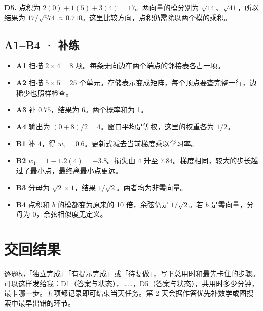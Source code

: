 \documentclass[UTF8,a4paper,11pt]{ctexart}
\begin{document}
\textbf{D5.} 点积为 $2(0)+1(5)+3(4)=17$。两向量的模分别为 $\sqrt{14}$、$\sqrt{41}$，所以结果为 $17/\sqrt{574}\approx0.710$。这里比较方向，点积仍需除以两个模的乘积。

\subsection{A1–B4 · 补练}
\begin{itemize}
\item \textbf{A1} 扫描 $2\times4=8$ 项。每条无向边在两个端点的邻接表各占一项。
\item \textbf{A2} 扫描 $5\times5=25$ 个单元。存储表示变成矩阵，每个顶点要查完整一行，边稀少也照样检查。
\item \textbf{A3} 补 $0.75$，结果为 $6$。两个概率和为 1。
\item \textbf{A4} 输出为 $(0+8)/2=4$。窗口平均是等权，这里的权重各为 $1/2$。
\item \textbf{B1} 补 $4$，得 $w_1=0.6$。更新式减去当前梯度乘以学习率。
\item \textbf{B2} $w_1=1-1.2(4)=-3.8$。损失由 $4$ 升至 $7.84$。梯度相同，较大的步长越过了最小点，最终离最小点更远。
\item \textbf{B3} 分母为 $\sqrt2\times1$，结果 $1/\sqrt2$。两者均为非零向量。
\item \textbf{B4} 点积和 $b$ 的模都变为原来的 10 倍，余弦仍是 $1/\sqrt2$。若 $b$ 是零向量，分母为 0，余弦相似度无定义。
\end{itemize}
\section{交回结果}
逐题标「独立完成」「有提示完成」或「待复做」，写下总用时和最先卡住的步骤。可以这样发给我：D1（答案与状态），……，D5（答案与状态），共用时多少分钟，最卡哪一步。五项都记录即可结束当天任务。第 2 天会据作答优先补数学或图搜索中最早出错的环节。
\end{document}
